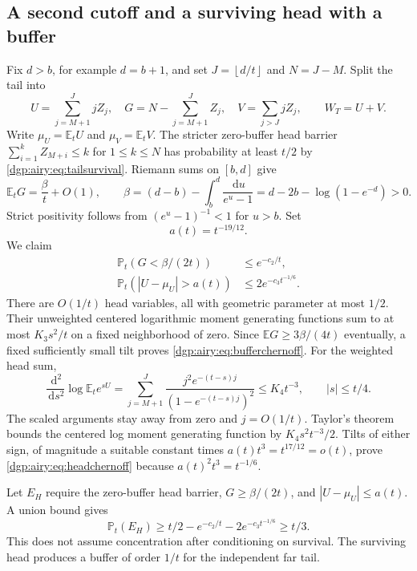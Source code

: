 \documentclass[11pt,letterpaper]{article}
\numberwithin{equation}{section}
\theoremstyle{remark}\newtheorem{remark}[theorem]{Remark}
\newcommand{\PP}{\mathbb P}
\newcommand{\EE}{\mathbb E}
\newcommand{\floor}[1]{\left\lfloor #1\right\rfloor}
\newcommand{\dd}{\,\mathrm d}
\begin{document}
\subsection{A second cutoff and a surviving head with a buffer}
Fix $d>b$, for example $d=b+1$, and set $J=\floor{d/t}$ and $N=J-M$.
Split the tail into
\[
 U=\sum_{j=M+1}^JjZ_j,\quad
 G=N-\sum_{j=M+1}^J Z_j,\quad
 V=\sum_{j>J}jZ_j,
 \qquad W_T=U+V.
\]
Write $\mu_U=\EE_tU$ and $\mu_V=\EE_tV$.
The stricter zero-buffer head barrier
$\sum_{i=1}^kZ_{M+i}\leq k$ for $1\leq k\leq N$
has probability at least $t/2$ by \eqref{dgp:airy:eq:tailsurvival}.
Riemann sums on $[b,d]$ give
\begin{equation}\label{dgp:airy:eq:buffermean}
 \EE_tG=\frac\beta t+O(1),\qquad
 \beta=(d-b)-\int_b^d\frac{\dd u}{e^u-1}
       =d-2b-\log(1-e^{-d})>0.
\end{equation}
Strict positivity follows from $(e^u-1)^{-1}<1$ for $u>b$.
Set
\begin{equation}\label{dgp:airy:eq:ascale}
 a(t)=t^{-19/12}.
\end{equation}
We claim
\begin{align}
 \PP_t(G<\beta/(2t))&\leq e^{-c_2/t},\label{dgp:airy:eq:bufferchernoff}\\
 \PP_t(|U-\mu_U|>a(t))&\leq2e^{-c_3t^{-1/6}}.\label{dgp:airy:eq:headchernoff}
\end{align}
There are $O(1/t)$ head variables, all with geometric parameter at
most $1/2$. Their unweighted centered logarithmic moment generating
functions sum to at most $K_3s^2/t$ on a fixed neighborhood of zero.
Since $\EE G\geq3\beta/(4t)$ eventually, a fixed sufficiently small
tilt proves \eqref{dgp:airy:eq:bufferchernoff}.
For the weighted head sum,
\[
 \frac{\dd^2}{\dd s^2}\log\EE_t e^{sU}
 =\sum_{j=M+1}^J\frac{j^2e^{-(t-s)j}}{(1-e^{-(t-s)j})^2}
 \leq K_4t^{-3},\qquad |s|\leq t/4.
\]
The scaled arguments stay away from zero and $j=O(1/t)$.
Taylor's theorem bounds the centered log moment generating function
by $K_4s^2t^{-3}/2$. Tilts of either sign, of magnitude a suitable
constant times $a(t)t^3=t^{17/12}=o(t)$, prove
\eqref{dgp:airy:eq:headchernoff} because $a(t)^2t^3=t^{-1/6}$.

Let $E_H$ require the zero-buffer head barrier,
$G\geq\beta/(2t)$, and $|U-\mu_U|\leq a(t)$.
A union bound gives
\begin{equation}\label{dgp:airy:eq:goodhead}
 \PP_t(E_H)\geq t/2-e^{-c_2/t}-2e^{-c_3t^{-1/6}}\geq t/3.
\end{equation}
This does not assume concentration after conditioning on survival.
The surviving head produces a buffer of order $1/t$ for the
independent far tail.
\end{document}
